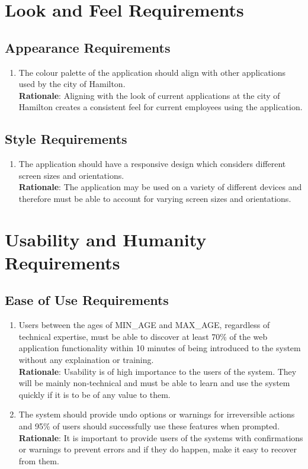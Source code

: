 \documentclass[12pt]{article}
\begin{document}
\newpage{}
\section{Look and Feel Requirements}
\subsection{Appearance Requirements}
\begin{enumerate}[{LF-AP}1.]
  \item The colour palette of the application should align with other
    applications used by the city of Hamilton. \\
    \textbf{Rationale}: Aligning with the look of current
    applications at the city of Hamilton creates a consistent feel
    for current employees using the application.
\end{enumerate}
\subsection{Style Requirements}
\begin{enumerate}[{LF-ST}1.]
  \item The application should have a responsive design which
    considers different screen sizes and orientations. \\
    \textbf{Rationale}: The application may be used on a variety of
    different devices and therefore must be able to account for
    varying screen sizes and orientations.
\end{enumerate}

\section{Usability and Humanity Requirements}
\subsection{Ease of Use Requirements}
\begin{enumerate}[{UH-EU}1.]
  \item Users between the ages of {MIN\_AGE} and {MAX\_AGE},
    regardless of technical expertise, must be able to discover at least 70\% of
    the web application functionality within 10 minutes of being introduced to
    the system without any explaination or training.\\
    \textbf{Rationale}: Usability is of high importance to the users
    of the system. They will be mainly non-technical and must be able
    to learn and use the system quickly if it is to be of any value to them.
  \item The system should provide undo options or warnings for
    irreversible actions and 95\% of users should successfully use
    these features when prompted.\\
    \textbf{Rationale}: It is important to provide users of the systems with
    confirmations or warnings to prevent errors and if they do happen, make it
    easy to recover from them.
\end{enumerate}
\end{document}
